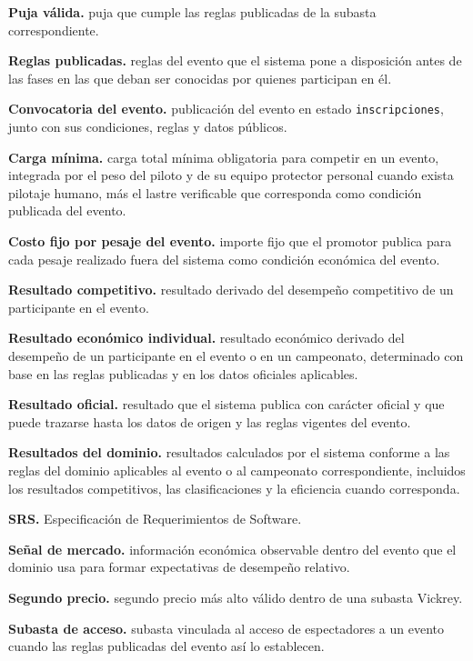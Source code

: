 \documentclass[10pt,letterpaper]{article}
\begin{document}
\noindent\textbf{Puja válida.} puja que cumple las reglas publicadas de la subasta correspondiente.\par
\noindent\textbf{Reglas publicadas.} reglas del evento que el sistema pone a disposición antes de las fases en las que deban ser conocidas por quienes participan en él.\par
\noindent\textbf{Convocatoria del evento.} publicación del evento en estado \texttt{inscripciones}, junto con sus condiciones, reglas y datos públicos.\par
\noindent\textbf{Carga mínima.} carga total mínima obligatoria para competir en un evento, integrada por el peso del piloto y de su equipo protector personal cuando exista pilotaje humano, más el lastre verificable que corresponda como condición publicada del evento.\par
\noindent\textbf{Costo fijo por pesaje del evento.} importe fijo que el promotor publica para cada pesaje realizado fuera del sistema como condición económica del evento.\par
\noindent\textbf{Resultado competitivo.} resultado derivado del desempeño competitivo de un participante en el evento.\par
\noindent\textbf{Resultado económico individual.} resultado económico derivado del desempeño de un participante en el evento o en un campeonato, determinado con base en las reglas publicadas y en los datos oficiales aplicables.\par
\noindent\textbf{Resultado oficial.} resultado que el sistema publica con carácter oficial y que puede trazarse hasta los datos de origen y las reglas vigentes del evento.\par
\noindent\textbf{Resultados del dominio.} resultados calculados por el sistema conforme a las reglas del dominio aplicables al evento o al campeonato correspondiente, incluidos los resultados competitivos, las clasificaciones y la eficiencia cuando corresponda.\par
\noindent\textbf{SRS.} Especificación de Requerimientos de Software.\par
\noindent\textbf{Señal de mercado.} información económica observable dentro del evento que el dominio usa para formar expectativas de desempeño relativo.\par
\noindent\textbf{Segundo precio.} segundo precio más alto válido dentro de una subasta Vickrey.\par
\noindent\textbf{Subasta de acceso.} subasta vinculada al acceso de espectadores a un evento cuando las reglas publicadas del evento así lo establecen.\par
\end{document}
